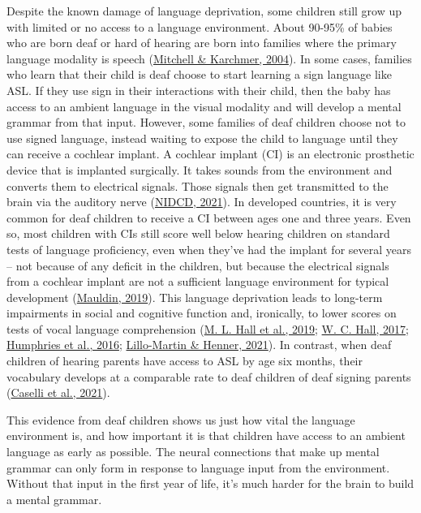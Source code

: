 \documentclass[
]{krantz}
\begin{document}
Despite the known damage of language deprivation, some children still grow up with limited or no access to a language environment. About 90-95\% of babies who are born deaf or hard of hearing are born into families where the primary language modality is speech (\protect\hyperlink{ref-mitchell-karchmer2004}{Mitchell \& Karchmer, 2004}). In some cases, families who learn that their child is deaf choose to start learning a sign language like ASL. If they use sign in their interactions with their child, then the baby has access to an ambient language in the visual modality and will develop a mental grammar from that input. However, some families of deaf children choose not to use signed language, instead waiting to expose the child to language until they can receive a cochlear implant. A cochlear implant (CI) is an electronic prosthetic device that is implanted surgically. It takes sounds from the environment and converts them to electrical signals. Those signals then get transmitted to the brain via the auditory nerve (\protect\hyperlink{ref-NIH-NIDCD}{NIDCD, 2021}). In developed countries, it is very common for deaf children to receive a CI between ages one and three years. Even so, most children with CIs still score well below hearing children on standard tests of language proficiency, even when they've had the implant for several years -- not because of any deficit in the children, but because the electrical signals from a cochlear implant are not a sufficient language environment for typical development (\protect\hyperlink{ref-mauldin2019}{Mauldin, 2019}). This language deprivation leads to long-term impairments in social and cognitive function and, ironically, to lower scores on tests of vocal language comprehension (\protect\hyperlink{ref-hall2019}{M. L. Hall et al., 2019}; \protect\hyperlink{ref-hall2017}{W. C. Hall, 2017}; \protect\hyperlink{ref-humphries2016}{Humphries et al., 2016}; \protect\hyperlink{ref-lillo2021}{Lillo-Martin \& Henner, 2021}). In contrast, when deaf children of hearing parents have access to ASL by age six months, their vocabulary develops at a comparable rate to deaf children of deaf signing parents (\protect\hyperlink{ref-caselli2021}{Caselli et al., 2021}).

This evidence from deaf children shows us just how vital the language environment is, and how important it is that children have access to an ambient language as early as possible. The neural connections that make up mental grammar can only form in response to language input from the environment. Without that input in the first year of life, it's much harder for the brain to build a mental grammar.
\end{document}
